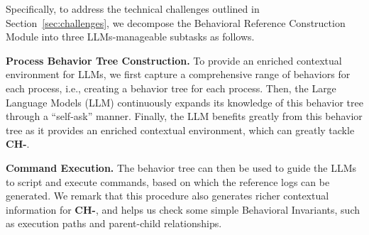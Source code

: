 Specifically, to address the technical challenges outlined in Section~\ref{sec:challenges}, we decompose the Behavioral Reference Construction Module into three LLMs-manageable subtasks as follows.




\noindent
{\bf Process Behavior Tree Construction.} To provide an enriched contextual environment for LLMs, we first capture a comprehensive range of behaviors for each process, i.e., creating a behavior tree for each process. Then, the Large Language Models (LLM) continuously expands its knowledge of this behavior tree through a ``self-ask'' manner. Finally, the LLM benefits greatly from this behavior tree as it provides an enriched contextual environment, which can greatly tackle {\bf CH-}.

\noindent
{\bf Command Execution.} The behavior tree can then be used to guide the LLMs to script and execute commands, based on which the reference logs can be generated. We remark that this procedure also generates richer contextual information for {\bf CH-}, and helps us check some simple Behavioral Invariants, such as execution paths and parent-child relationships. %

